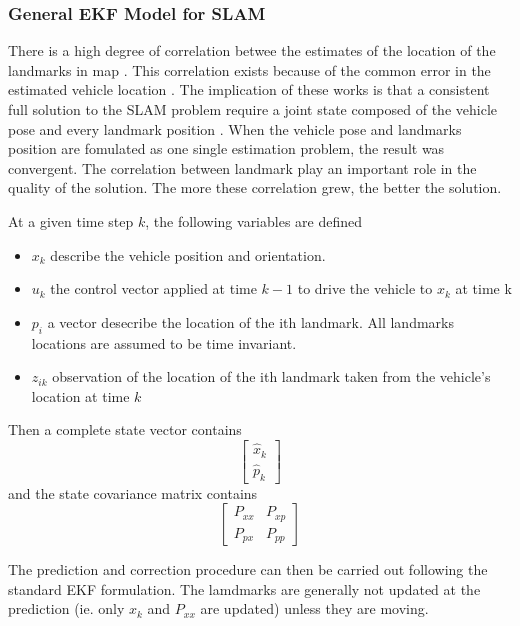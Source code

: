 \subsubsection{General EKF Model for SLAM}
There is a high degree of correlation betwee the estimates of the
location of the landmarks in map \cite{smith_representation_1986}
\cite{durrant-whyte_uncertain_1988}. This correlation exists because
of the common error in the estimated vehicle location
\cite{leonard_simultaneous_1991}. The implication of these works is
that a consistent full solution to the SLAM problem require a joint
state composed of the vehicle pose and every landmark position
\cite{durrant-whyte_simultaneous_2006}. When the vehicle pose and
landmarks position are fomulated as one single estimation problem, the
result was convergent. The correlation between landmark play an
important role in the quality of the solution. The more these
correlation grew, the better the solution.
\cite{durrant-whyte_localization_1996} \cite{csorba_new_1996}
\cite{csorba_simultaneous_1997}

At a given time step $k$, the following variables are defined
\begin{itemize}
  \item $x_k$ describe the vehicle position and orientation.
  \item $u_k$ the control vector applied at time $k-1$ to drive the
  vehicle to $x_k$ at time k
  \item $p_i$ a vector desecribe the location of the ith landmark. All
  landmarks locations are assumed to be time invariant.  
  \item $z_{ik}$ observation of the location of the ith landmark taken
  from the vehicle's location at time $k$
\end{itemize}

Then a complete state vector contains
$$\begin{bmatrix}\hat{x}_k \\ \hat{p}_k \end{bmatrix}$$
\noindent and the state covariance matrix contains
$$\begin{bmatrix}
P_{xx} & P_{xp} \\
P_{px} & P_{pp} 
\end{bmatrix} $$

The prediction and correction procedure can then be carried out
following the standard EKF formulation. The lamdmarks are generally
not updated at the prediction (ie. only $x_k$ and $P_{xx}$ are
updated) unless they are moving.

